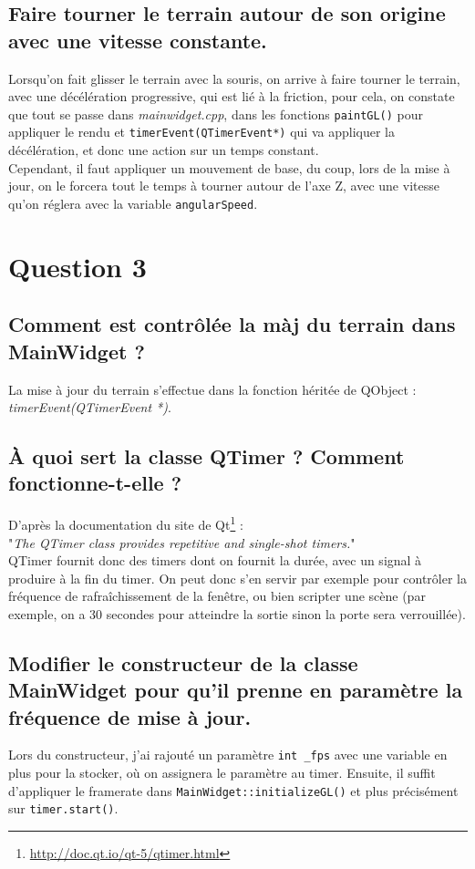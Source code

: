 \documentclass[a4paper,11pt]{report}
\begin{document}
	\subsection{Faire tourner le terrain autour de son origine avec une vitesse constante.}
		Lorsqu'on fait glisser le terrain avec la souris, on arrive à faire tourner le terrain, avec une décélération progressive, qui est lié à la friction, pour cela, on constate que tout se passe dans \textit{mainwidget.cpp}, dans les fonctions \texttt{paintGL()} pour appliquer le rendu et \texttt{timerEvent(QTimerEvent*)} qui va appliquer la décélération, et donc une action sur un temps constant.\\
		Cependant, il faut appliquer un mouvement de base, du coup, lors de la mise à jour, on le forcera tout le temps à tourner autour de l'axe Z, avec une vitesse qu'on réglera avec la variable \texttt{angularSpeed}.

	\pagebreak	
	\section{Question 3}
	\subsection{Comment est contrôlée la màj du terrain dans MainWidget ?}
	La mise à jour du terrain s'effectue dans la fonction héritée de QObject :  \textit{timerEvent(QTimerEvent *)}.
	
	\subsection{À quoi sert la classe QTimer ? Comment fonctionne-t-elle ?}
	D'après la documentation du site de Qt\footnote{\url{http://doc.qt.io/qt-5/qtimer.html}} :\\
	"\textit{The QTimer class provides repetitive and single-shot timers.}"\\
	QTimer fournit donc des timers dont on fournit la durée, avec un signal à produire à la fin du timer. On peut donc s'en servir par exemple pour contrôler la fréquence de rafraîchissement de la fenêtre, ou bien scripter une scène (par exemple, on a 30 secondes pour atteindre la sortie sinon la porte sera verrouillée).
	 
	
	\subsection{Modifier le constructeur de la classe MainWidget pour qu'il prenne en paramètre la fréquence de mise à jour.}
	Lors du constructeur, j'ai rajouté un paramètre \texttt{int \_fps} avec une variable en plus pour la stocker, où on assignera le paramètre au timer. Ensuite, il suffit d'appliquer le framerate dans \texttt{MainWidget::initializeGL()} et plus précisément sur \texttt{timer.start()}.
	
\end{document}
